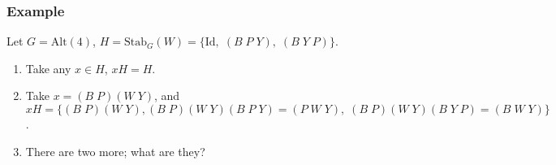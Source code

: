 \documentclass[11pt]{article}
\newcommand{\0}{\emptyset}
\begin{document}
\subsubsection*{Example}
\label{sec:orga6fadbc}
Let \(G=\text{Alt}(4)\), \(H=\text{Stab}_{G}(W)=\{\text{Id},\;(B\;P\;Y),\;(B\;Y\;P)\}\).\\[0pt]
\begin{enumerate}
\item Take any \(x\in H\), \(xH=H\).\\[0pt]
\item Take \(x=(B\;P)(W\;Y)\), and \(xH=\{(B\;P)(W\;Y),(B\;P)(W\;Y)(B\;P\;Y)=(P\;W\;Y),\;(B\;P)(W\;Y)(B\;Y\;P)=(B\;W\;Y)\}\).\\[0pt]
\item There are two more; what are they?\\[0pt]
\end{enumerate}
\end{document}
